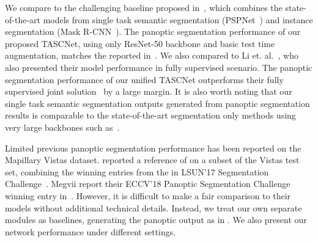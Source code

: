 \documentclass[10pt,twocolumn]{article}
\begin{document}
We compare to the challenging baseline proposed in~\cite{kirillov2018panoptic}, which combines the state-of-the-art models from single task semantic segmentation (PSPNet~\cite{zhao2017pyramid}) and instance segmentation (Mask R-CNN~\cite{he2017mask}). The panoptic segmentation performance of our proposed TASCNet, using only ResNet-50 backbone and basic test time augmentation, matches the  reported in~\cite{kirillov2018panoptic}.
We also compared to Li et. al.~\cite{Li_2018_ECCV}, who also presented their model performance in fully supervised scenario. The panoptic segmentation performance of our unified TASCNet outperforms their fully supervised joint solution~\cite{Li_2018_ECCV} by a large margin. 
It is also worth noting that our single task semantic segmentation outputs generated from panoptic segmentation results is comparable to the state-of-the-art segmentation only methods using very large backbones such as~\cite{bulo2017place}. 






Limited previous panoptic segmentation performance has been reported on the Mapillary Vistas dataset. \cite{kirillov2018panoptic} reported a reference  of  on a subset of the Vistas test set, combining the winning entries from the in LSUN'17 Segmentation Challenge~\cite{zhao2017pyramid,liulsun}. Megvii report their ECCV'18 Panoptic Segmentation Challenge winning entry in~\cite{megvii-challenge}. However, it is difficult to make a fair comparison to their models without additional technical details. Instead, we treat our own separate modules as baselines, generating the panoptic output as in \cite{kirillov2018panoptic}. We also present our network performance under different settings. 
\end{document}
